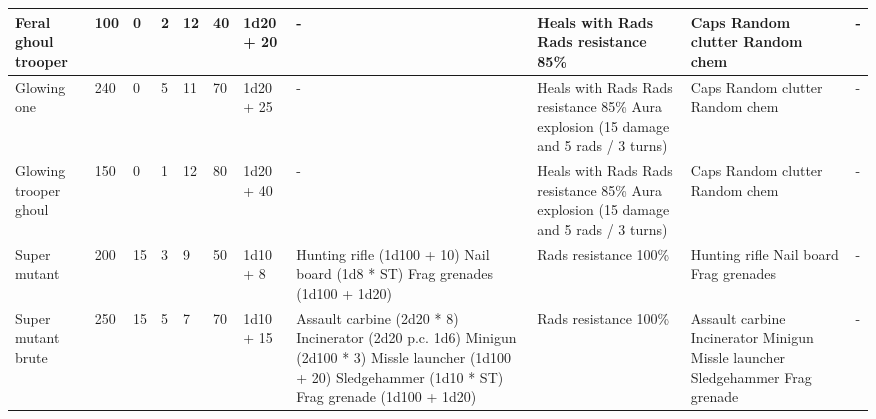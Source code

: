\begin{longtable}{|p{2.5cm}|p{0.6cm}|p{0.6cm}|p{0.6cm}|p{0.6cm}|p{0.6cm}|p{1.5cm}|p{4cm}|p{4cm}|p{4cm}|p{2.3cm}|}
\hline
Feral ghoul trooper & 100 & 0 & 2 & 12 & 40 & 1d20 + 20 & - & Heals with Rads \newline Rads resistance 85\% & Caps \newline Random clutter \newline Random chem & - \\
\hline
Glowing one & 240 & 0 & 5 & 11 & 70 & 1d20 + 25 & - & Heals with Rads \newline Rads resistance 85\% \newline Aura explosion (15 damage and 5 rads / 3 turns) & Caps \newline Random clutter \newline Random chem & - \\
\hline
Glowing trooper ghoul & 150 & 0 & 1 & 12 & 80 & 1d20 + 40 & - & Heals with Rads \newline Rads resistance 85\% \newline Aura explosion (15 damage and 5 rads / 3 turns) & Caps \newline Random clutter \newline Random chem & - \\
\hline
Super mutant & 200 & 15 & 3 & 9 & 50 & 1d10 + 8 & Hunting rifle (1d100 + 10) \newline Nail board (1d8 * ST) \newline Frag grenades (1d100 + 1d20) & Rads resistance 100\% & Hunting rifle \newline Nail board \newline Frag grenades & - \\
\hline
Super mutant brute & 250 & 15 & 5 & 7 & 70 & 1d10 + 15 & Assault carbine (2d20 * 8) \newline Incinerator (2d20 p.c. 1d6) \newline Minigun (2d100 * 3) \newline Missle launcher (1d100 + 20) \newline Sledgehammer (1d10 * ST) \newline Frag grenade (1d100 + 1d20) & Rads resistance 100\% & Assault carbine \newline Incinerator \newline Minigun \newline Missle launcher \newline Sledgehammer \newline Frag grenade & - \\
\hline

\end{longtable}
